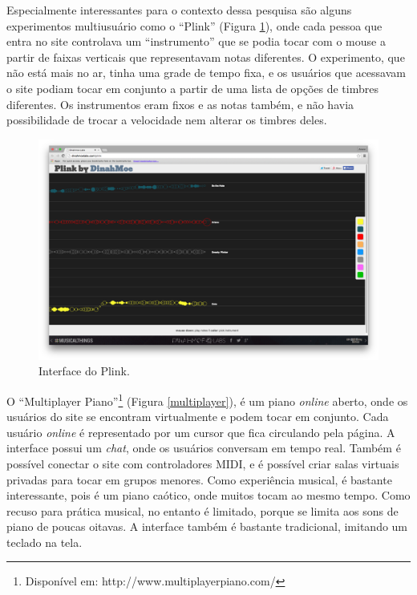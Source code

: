Especialmente interessantes para o contexto dessa pesquisa são alguns experimentos multiusuário como o ``Plink'' (Figura \ref{plink}), onde cada pessoa que entra no site controlava um ``instrumento'' que se podia tocar com o mouse a partir de faixas verticais que representavam notas diferentes. O experimento, que não está mais no ar, tinha uma grade de tempo fixa, e os usuários que acessavam o site podiam tocar em conjunto a partir de uma lista de opções de timbres diferentes. Os instrumentos eram fixos e as notas também, e não havia possibilidade de trocar a velocidade nem alterar os timbres deles. 

\begin{figure}
    \caption{\label{plink}Interface do Plink.}
    
        \includegraphics[width=1\linewidth]{pictures/cap2/plink}
    
\end{figure}

O ``Multiplayer Piano''\footnote{Disponível em: http://www.multiplayerpiano.com/} (Figura \ref{multiplayer}), é um piano \emph{online} aberto, onde os usuários do site se encontram virtualmente e podem tocar em conjunto. Cada usuário \emph{online} é representado por um cursor que fica circulando pela página. A interface possui um \emph{chat}, onde os usuários conversam em tempo real. Também é possível conectar o site com controladores MIDI, e é possível criar salas virtuais privadas para tocar em grupos menores. Como experiência musical, é bastante interessante, pois é um piano caótico, onde muitos tocam ao mesmo tempo. Como recuso para prática musical, no entanto é limitado, porque se limita aos sons de piano de poucas oitavas. A interface também é bastante tradicional, imitando um teclado na tela.


